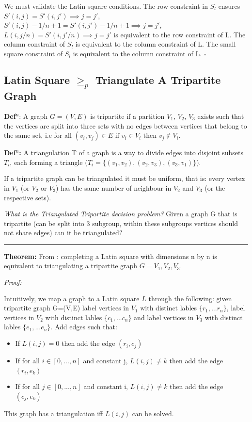 \documentclass[a4paper,11pt]{report}
\newcounter{row}
\newcounter{col}
\begin{document}
We must validate the Latin square conditions. The row constraint in $S_l$ ensures $S'(i,j)=S'(i,j') \implies j=j'$, $S'(i,j)-1/n+1=S'(i,j')-1/n+1 \implies j=j'$, $L(i,j/n)=S'(i,j'/n) \implies j=j'$ is equivalent to the row constraint of L. The column constraint of $S_l$ is equivalent to the column constraint of L. The small square constraint of $S_l$ is equivalent to the column constraint of L. $\square$




\subsection{Latin Square $\geq_p$ Triangulate A Tripartite Graph}

\textbf{Def$^n$}: A graph $G=(V,E)$ is tripartite if a partition $V_1$, $V_2$, $V_3$ exists such that the vertices are split into three sets with no edges between vertices that belong to the same set, i.e for all $(v_i,v_j) \in E\text{ if } v_i \in V_i\text{ then }v_j \not\in V_i $.

\textbf{Def$^n$:} A triangulation T of a graph is a way to divide edges into disjoint subsets $T_i$, each forming a triangle ($T_i=\{(v_{1}, v_{2}),(v_{2}, v_{3}),(v_{3},v_{1})\}$).

If a tripartite graph can be triangulated it must be uniform, that is: every vertex in $V_1$ (or $V_2$ or $V_3$) has the same number of neighbour in $V_2$ and $V_3$ (or the respective sets).

\textit{What is the Triangulated Tripartite decision problem?} Given a graph G that is tripartite (can be split into 3 subgroup, within these subgroups vertices should not share edges) can it be triangulated?

\noindent\rule{4cm}{0.4pt}

\textbf{Theorem:} From \cite{lsttg}: completing a Latin square with dimensions n by n is equivalent to triangulating a tripartite graph $G= V_1, V_2, V_3$.

\textit{Proof:} 

Intuitively, we map a graph to a Latin square $L$ through the following: 
given tripartite graph G=(V,E) label vertices in $V_1$ with distinct lables $\{r_1,...r_n\}$, label vertices in $V_2$ with distinct lables $\{c_1,...c_n\}$ and label vertices in $V_3$ with distinct lables $\{e_1,...e_n\}$. Add edges such that:
\begin{itemize}
\item{If $L(i,j) = 0$ then add the edge $(r_i,c_j)$ }
\item{If for all $i \in [0,...,n]$ and constant j, $L(i,j) \neq k$ then add the edge $(r_i,e_k)$}
\item{If for all $j \in [0,...,n]$ and constant i, $L(i,j) \neq k$ then add the edge $(c_j,e_k)$}
\end{itemize}
This graph has a triangulation iff $L(i,j)$ can be solved.
\end{document}
